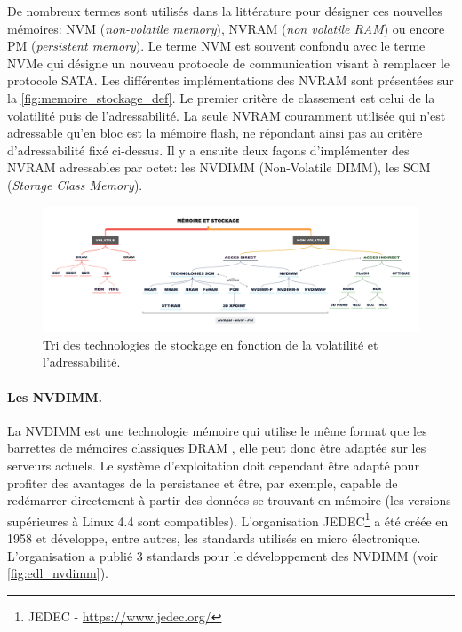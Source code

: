             De nombreux termes sont utilisés dans la littérature pour désigner ces nouvelles mémoires: NVM (\textit{non-volatile memory}), NVRAM (\textit{non volatile RAM}) ou encore PM (\textit{persistent memory}). Le terme NVM est souvent confondu avec le terme NVMe qui désigne un nouveau protocole de communication visant à remplacer le protocole SATA. Les différentes implémentations des NVRAM sont présentées sur la \autoref{fig:memoire_stockage_def}. Le premier critère de classement est celui de la volatilité puis de l'adressabilité. La seule NVRAM couramment utilisée qui n'est adressable qu'en bloc est la mémoire flash, ne répondant ainsi pas au critère d'adressabilité fixé ci-dessus. Il y a ensuite deux façons d'implémenter des NVRAM adressables par octet: les NVDIMM (Non-Volatile DIMM), les SCM (\textit{Storage Class Memory}).
            
            
            \begin{figure}
                \center
                \includegraphics[width=17cm]{images/memoire_stockage_def.png}
                \caption{\label{fig:memoire_stockage_def} Tri des technologies de stockage en fonction de la volatilité et l'adressabilité.}
            \end{figure}
    
    
    
    \paragraph{Les NVDIMM.}\label{sec:nvdimm}
    
        La NVDIMM est une technologie mémoire qui utilise le même format que les barrettes de mémoires classiques DRAM \cite{ChrisEvans2017}, elle peut donc être adaptée sur les serveurs actuels. Le système d'exploitation doit cependant être adapté pour profiter des avantages de la persistance et être, par exemple, capable de redémarrer directement à partir des données se trouvant en mémoire (les versions supérieures à Linux 4.4 sont compatibles). L'organisation JEDEC\footnote{JEDEC - \url{https://www.jedec.org/}} a été créée en 1958 et développe, entre autres, les standards utilisés en micro électronique. L'organisation a publié 3 standards pour le développement des NVDIMM (voir \autoref{fig:edl_nvdimm}).
    
